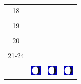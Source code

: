 \documentclass[twoside, a4paper,12pt, tikz]{scrartcl}
\begin{document}
\begin{tabularx}{\linewidth}{|c|X|X|X|}
        &   &       &    \\
      \hline
      18&   &       &    \\
        &   &       &    \\
      \hline
      19&   &       &    \\
        &   &       &    \\
      \hline
      20&   &       &    \\
        &   &       &    \\
      \hline
      21-24&   &       &    \\
        &   &       &    \\
      \hline  
      & \vspace{0.01cm} \centerline{\includegraphics[width=0.5cm]{moon_phases/Moon_phase_5.svg.png}} \vspace{0.1cm} & \vspace{0.01cm} \centerline{\includegraphics[width=0.5cm]{moon_phases/Moon_phase_5.svg.png}} \vspace{0.1cm} & \vspace{0.01cm} \centerline{\includegraphics[width=0.5cm]{moon_phases/Moon_phase_5.svg.png}} \vspace{0.1cm}\\
      \hline   
    \end{tabularx}




    \newpage

        \noindent
\end{document}
